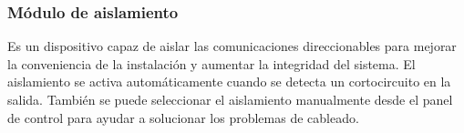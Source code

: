 \subsubsection{Módulo de aislamiento}

Es un dispositivo capaz de aislar las comunicaciones direccionables para mejorar la conveniencia de la instalación y aumentar la integridad del sistema. El aislamiento se activa automáticamente cuando se detecta un cortocircuito en la salida. También se puede seleccionar el aislamiento manualmente desde el panel de control para ayudar a solucionar los problemas de cableado.\cite{MAislamiento}





